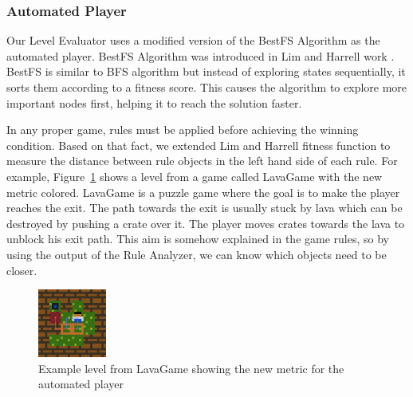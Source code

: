 \documentclass[letterpaper]{article}
\newcommand{\figref}[1]{Figure~\ref{Figure:#1}}
\begin{document}
\subsubsection{Automated Player}
Our Level Evaluator uses a modified version of the BestFS Algorithm as the automated player. BestFS Algorithm was introduced in Lim and Harrell work \cite{puzzleScriptGeneration}. BestFS is similar to BFS algorithm but instead of exploring states sequentially, it sorts them according to a fitness score. This causes the algorithm to explore more important nodes first, helping it to reach the solution faster.\\\par

In any proper game, rules must be applied before achieving the winning condition. Based on that fact, we extended Lim and Harrell fitness function to measure the distance between rule objects in the left hand side of each rule. For example, \figref{lavaGame} shows a level from a game called LavaGame with the new metric colored. LavaGame is a puzzle game where the goal is to make the player reaches the exit. The path towards the exit is usually stuck by lava which can be destroyed by pushing a crate over it. The player moves crates towards the lava to unblock his exit path. This aim is somehow explained in the game rules, so by using the output of the Rule Analyzer, we can know which objects need to be closer.

\begin{figure}[ht]
  	\centering
    \includegraphics[width=0.2\textwidth]{Images/lavaGame}
    \caption{Example level from LavaGame showing the new metric for the automated player}
    \label{Figure:lavaGame}
\end{figure}
\end{document}
